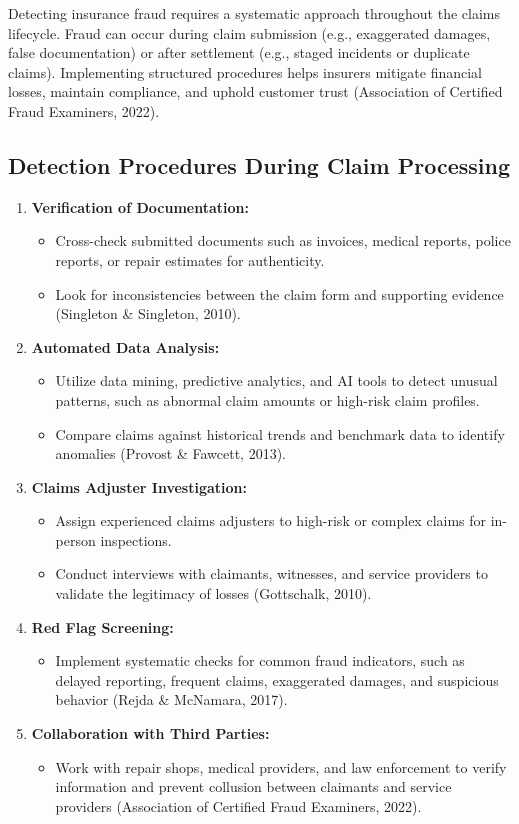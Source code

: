 \documentclass[12pt,a4paper]{article}
\begin{document}
Detecting insurance fraud requires a systematic approach throughout the claims lifecycle. Fraud can occur during claim submission (e.g., exaggerated damages, false documentation) or after settlement (e.g., staged incidents or duplicate claims). Implementing structured procedures helps insurers mitigate financial losses, maintain compliance, and uphold customer trust (Association of Certified Fraud Examiners, 2022).

\subsection{Detection Procedures During Claim Processing}
\begin{enumerate}
    \item \textbf{Verification of Documentation:}
    \begin{itemize}
        \item Cross-check submitted documents such as invoices, medical reports, police reports, or repair estimates for authenticity.
        \item Look for inconsistencies between the claim form and supporting evidence (Singleton \& Singleton, 2010).
    \end{itemize}
    \item \textbf{Automated Data Analysis:}
    \begin{itemize}
        \item Utilize data mining, predictive analytics, and AI tools to detect unusual patterns, such as abnormal claim amounts or high-risk claim profiles.
        \item Compare claims against historical trends and benchmark data to identify anomalies (Provost \& Fawcett, 2013).
    \end{itemize}
    \item \textbf{Claims Adjuster Investigation:}
    \begin{itemize}
        \item Assign experienced claims adjusters to high-risk or complex claims for in-person inspections.
        \item Conduct interviews with claimants, witnesses, and service providers to validate the legitimacy of losses (Gottschalk, 2010).
    \end{itemize}
    \item \textbf{Red Flag Screening:}
    \begin{itemize}
        \item Implement systematic checks for common fraud indicators, such as delayed reporting, frequent claims, exaggerated damages, and suspicious behavior (Rejda \& McNamara, 2017).
    \end{itemize}
    \item \textbf{Collaboration with Third Parties:}
    \begin{itemize}
        \item Work with repair shops, medical providers, and law enforcement to verify information and prevent collusion between claimants and service providers (Association of Certified Fraud Examiners, 2022).
    \end{itemize}
\end{enumerate}
\end{document}
